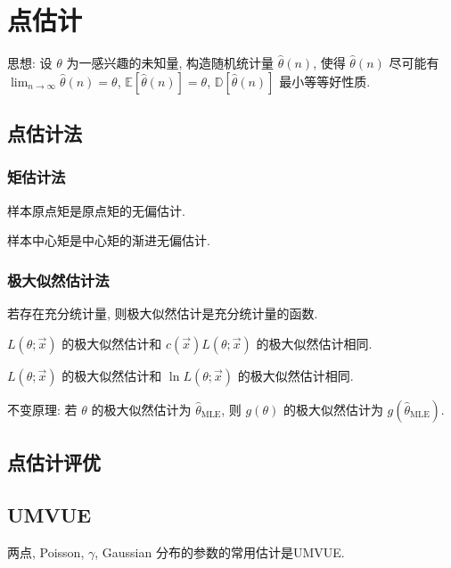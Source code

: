 \chapter{点估计}

思想: 设 $\theta$ 为一感兴趣的未知量, 构造随机统计量 $\hat{\theta}(n)$, 使得 $\hat{\theta}(n)$ 尽可能有 $\lim_{n\to\infty}\hat{\theta}(n)=\theta$, $\mathbb{E}[\hat{\theta}(n)]=\theta$, $\mathbb{D}[\hat{\theta}(n)]$ 最小等等好性质.

\section{点估计法}

\subsection{矩估计法}

样本原点矩是原点矩的无偏估计.

样本中心矩是中心矩的渐进无偏估计.

\subsection{极大似然估计法}

若存在充分统计量, 则极大似然估计是充分统计量的函数.

$L(\theta;\vec{x})$ 的极大似然估计和 $c(\vec{x})L(\theta;\vec{x})$ 的极大似然估计相同.

$L(\theta;\vec{x})$ 的极大似然估计和 $\ln L(\theta;\vec{x})$ 的极大似然估计相同.

不变原理: 若 $\theta$ 的极大似然估计为 $\hat{\theta}_{\text{MLE}}$, 则 $g(\theta)$ 的极大似然估计为 $g(\hat{\theta}_{\text{MLE}})$.

\section{点估计评优}

\section{UMVUE}

两点, Poisson, $\gamma$, Gaussian 分布的参数的常用估计是UMVUE.
